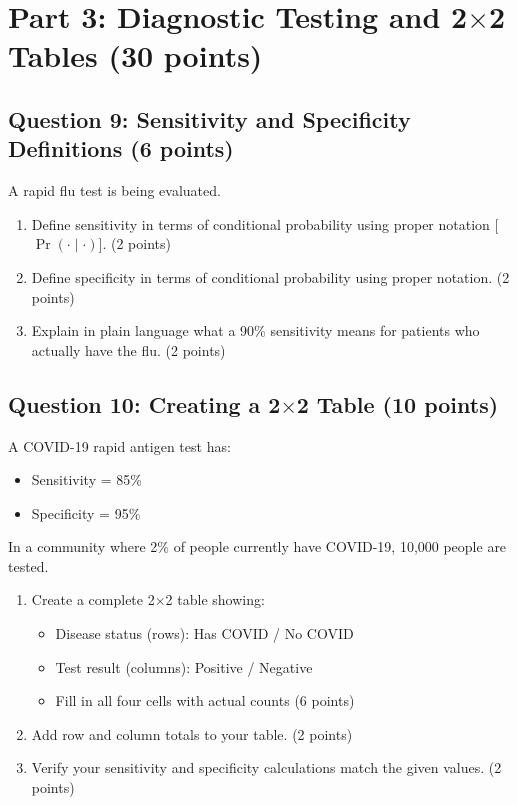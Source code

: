 \documentclass[11pt]{article}
\begin{document}
\vspace{1.5cm}

\section{Part 3: Diagnostic Testing and 2$\times$2 Tables (30 points)}

\subsection*{Question 9: Sensitivity and Specificity Definitions (6 points)}

A rapid flu test is being evaluated.

\begin{enumerate}[label=\alph*)]
\item Define sensitivity in terms of conditional probability using proper notation [$\Pr(\cdot \mid \cdot)$]. (2 points)
\item Define specificity in terms of conditional probability using proper notation. (2 points)
\item Explain in plain language what a 90\% sensitivity means for patients who actually have the flu. (2 points)
\end{enumerate}

\vspace{1.5cm}

\subsection*{Question 10: Creating a 2$\times$2 Table (10 points)}

A COVID-19 rapid antigen test has:
\begin{itemize}
\item Sensitivity = 85\%
\item Specificity = 95\%
\end{itemize}

In a community where 2\% of people currently have COVID-19, 10,000 people are tested.

\begin{enumerate}[label=\alph*)]
\item Create a complete 2$\times$2 table showing:
   \begin{itemize}
   \item Disease status (rows): Has COVID / No COVID
   \item Test result (columns): Positive / Negative
   \item Fill in all four cells with actual counts (6 points)
   \end{itemize}
\item Add row and column totals to your table. (2 points)
\item Verify your sensitivity and specificity calculations match the given values. (2 points)
\end{enumerate}
\end{document}
